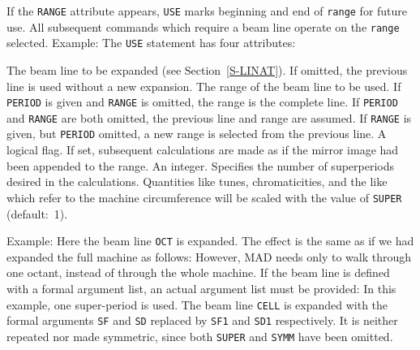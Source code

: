 If the {\tt RANGE} attribute appears,
{\tt USE} marks beginning and end of {\tt range} for future use.
All subsequent commands which require a beam line operate on the
{\tt range} selected.
Example:
The {\tt USE} statement has four attributes:
\begin{mylist}
The beam line to be expanded (see Section~\ref{S-LINAT}).
If omitted, the previous line is used without a new expansion.
The range of the beam line to be used.
If {\tt PERIOD} is given and {\tt RANGE} is omitted,
the range is the complete line.
If {\tt PERIOD} and {\tt RANGE} are both omitted,
the previous line and range are assumed.
If {\tt RANGE} is given, but {\tt PERIOD} omitted,
a new range is selected from the previous line.
A logical flag.
If set, subsequent calculations are made as if the mirror image had
been appended to the range.
An integer.
Specifies the number of superperiods desired in the calculations.
Quantities like tunes, chromaticities, and the like which refer to
the machine circumference will be scaled with the value of
{\tt SUPER} (default:~1).
\end{mylist}
Example:
Here the beam line {\tt OCT} is expanded.
The effect is the same as if we had expanded the full machine as follows:
However, MAD needs only to walk through one octant,
instead of through the whole machine.
If the beam line is defined with a formal argument list,
an actual argument list must be provided:
In this example, one super-period is used.
The beam line {\tt CELL} is expanded with the formal arguments
{\tt SF} and {\tt SD} replaced by
{\tt SF1} and {\tt SD1} respectively.
It is neither repeated nor made symmetric,
since both {\tt SUPER} and {\tt SYMM} have been omitted.
 
